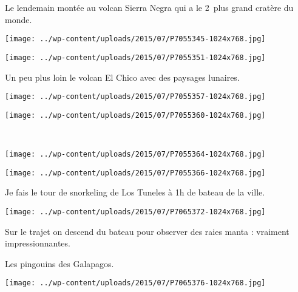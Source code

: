 Le lendemain montée au volcan Sierra Negra qui a le 2\ieme\ plus grand cratère du monde. 
\begin{center} \texttt{[image: ../wp-content/uploads/2015/07/P7055345-1024x768.jpg]} \end{center}
\begin{center} \texttt{[image: ../wp-content/uploads/2015/07/P7055351-1024x768.jpg]} \end{center}
\vspace{-\topsep}
\vspace{-2.75mm}
\pagebreak

Un peu plus loin le volcan El Chico avec des paysages lunaires. 
\begin{center} \texttt{[image: ../wp-content/uploads/2015/07/P7055357-1024x768.jpg]} \end{center}
\begin{center} \texttt{[image: ../wp-content/uploads/2015/07/P7055360-1024x768.jpg]} \end{center}
\vspace{-\topsep}
\vspace{-3.25mm}
\pagebreak
~
\begin{center} \texttt{[image: ../wp-content/uploads/2015/07/P7055364-1024x768.jpg]} \end{center}
\begin{center} \texttt{[image: ../wp-content/uploads/2015/07/P7055366-1024x768.jpg]} \end{center}
\vspace{-\topsep}
\vspace{-3.25mm}
\pagebreak

Je fais le tour de snorkeling de Los Tuneles à 1h de bateau de la ville. \\
\begin{center} \texttt{[image: ../wp-content/uploads/2015/07/P7065372-1024x768.jpg]} \end{center}

Sur le trajet on descend du bateau pour observer des raies manta : vraiment impressionnantes. 

Les pingouins des Galapagos.
\begin{center} \texttt{[image: ../wp-content/uploads/2015/07/P7065376-1024x768.jpg]} \end{center}
\vspace{-\topsep}
\pagebreak

